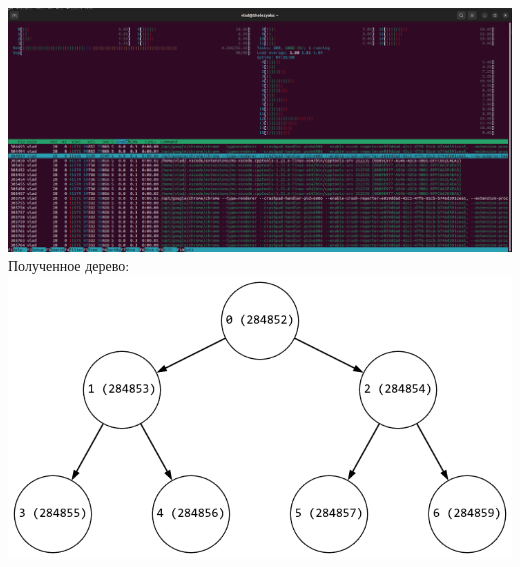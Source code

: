 \documentclass[a4paper,14pt]{extarticle}
\begin{document}
\includegraphics[width=140mm]{for_loop_htop_after}\\
Полученное дерево:\\
\includegraphics[width=140mm]{for_loop.png}\\
\end{document}
